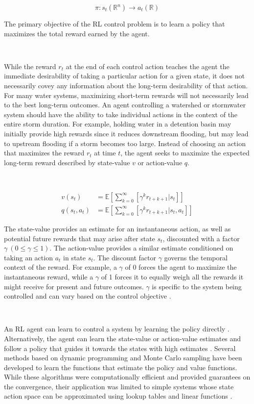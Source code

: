 \begin{equation}
    \pi :s_t (\mathbb{R}^n ) \rightarrow a_t (\mathbb{R})
\end{equation}

The primary objective of the RL control problem is to learn a policy that maximizes the total reward earned by the agent.

\

While the reward $r_t$ at the end of each control action teaches the agent the immediate desirability of taking a particular action for a given state, it does not necessarily covey any information about the long-term desirability of that action.
For many water systems, maximizing short-term rewards will not necessarily lead to the best long-term outcomes.
An agent controlling a watershed or stormwater system should have the ability to take individual actions in the context of the entire storm duration.
For example, holding water in a detention basin may initially provide high rewards since it reduces downstream flooding, but may lead to upstream flooding if a storm becomes too large.
Instead of choosing an action that maximizes the reward $r_t$  at time $t$, the agent seeks to maximize the expected long-term reward described by state-value $v$ or action-value $q$.

\

\begin{align}
	v(s_t) &= \mathbb{E} \left[\sum_{k=0}^\infty \left[\gamma^k r_{t+k+1} \Big| s_t\right] \right] \\
	q(s_t,a_t) &= \mathbb{E} \left[\sum_{k=0}^\infty \left[\gamma^k r_{t+k+1} \Big| s_t, a_t\right] \right]
\end{align}

The state-value provides an estimate for an instantaneous action, as well as potential future rewards that may arise after state $s_t$, discounted with a factor $\gamma\ (0 \leq \gamma \leq 1)$.
The action-value provides a similar estimate conditioned on taking an action $a_t$ in state $s_t$.
The discount factor $\gamma$ governs the temporal context of the reward.
For example, a $\gamma$ of 0 forces the agent to maximize the instantaneous reward, while a $\gamma$ of 1 forces it to equally weigh all the rewards it might receive for present and future outcomes.
$\gamma$ is specific to the system being controlled and can vary based on the control objective \cite{Sutton98}.

\

An RL agent can learn to control a system by learning the policy directly \cite{sutton2000policy}.
Alternatively, the agent can learn the state-value or action-value estimates and follow a policy that guides it towards the states with high estimates \cite{Sutton98}.
Several methods based on dynamic programming \cite{Watkins1992Q-learning, sutton1991planning} and Monte Carlo sampling \cite{Sutton98} have been developed to learn the functions that estimate the policy and value functions.
While these algorithms were computationally efficient and provided guarantees on the convergence, their application was limited to simple systems whose state action space can be approximated using lookup tables and linear functions \cite{Sutton98,mnih2013playing}.

